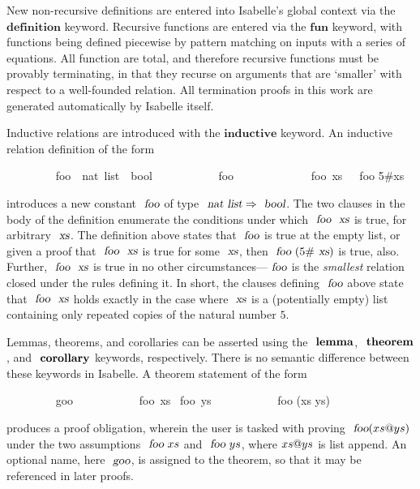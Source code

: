 New non-recursive definitions are entered into Isabelle's global context via the $\mathbf{definition}$ keyword.
Recursive functions are entered via the $\mathbf{fun}$ keyword, with functions being defined piecewise by pattern matching on inputs with a series of equations.
All function are total, and therefore recursive functions must be provably terminating, in that they recurse on arguments that are `smaller' with respect to a well-founded relation.
All termination proofs in this work are generated automatically by Isabelle itself.

Inductive relations are introduced with the $\mathbf{inductive}$ keyword.
An inductive relation definition of the form
\vspace{0.375em}
\begin{isabellebody}
\ \ \ \ \ \ \ \  foo\ {\isacharcolon}{\isacharcolon}\ {\isachardoublequoteopen}nat\ list\ {\isasymRightarrow}\ bool{\isachardoublequoteclose}\ \isanewline
\ \ \ \ \ \ \ \ \ \ {\isachardoublequoteopen}foo\ {\isacharbrackleft}{\isacharbrackright}{\isachardoublequoteclose}\ {\isacharbar}\isanewline
\ \ \ \ \ \ \ \ \ \ {\isachardoublequoteopen}{\isasymlbrakk}\ foo\ xs\ {\isasymrbrakk}\ {\isasymLongrightarrow}\ foo {\isacharparenleft}5\#xs{\isacharparenright}{\isachardoublequoteclose}
\end{isabellebody}
\vspace{0.375em}
\noindent
introduces a new constant $\isa{foo}$ of type $\isa{nat list} \Rightarrow \isa{bool}$.
The two clauses in the body of the definition enumerate the conditions under which $\isa{foo}\ \isa{xs}$ is true, for arbitrary $\isa{xs}$.
The definition above states that $\isa{foo}$ is true at the empty list, or given a proof that $\isa{foo}\ \isa{xs}$ is true for some $\isa{xs}$, then $\isa{foo}\ (5\#\isa{xs})$ is true, also.
Further, $\isa{foo}\ \isa{xs}$ is true in no other circumstances---$\isa{foo}$ is the \emph{smallest} relation closed under the rules defining it.
In short, the clauses defining $\isa{foo}$ above state that $\isa{foo}\ \isa{xs}$ holds exactly in the case where $\isa{xs}$ is a (potentially empty) list containing only repeated copies of the natural number $5$.

Lemmas, theorems, and corollaries can be asserted using the $\isacommand{lemma}$, $\isacommand{theorem}$, and $\isacommand{corollary}$ keywords, respectively.
There is no semantic difference between these keywords in Isabelle.
A theorem statement of the form
\vspace{0.375em}
\begin{isabellebody}
\ \ \ \ \ \ \ \  goo{\isacharcolon}\isanewline
\ \ \ \ \ \ \ \ \ \ \ foo\ xs \ foo\ ys \isanewline
\ \ \ \ \ \ \ \ \ \ \ foo (xs \isacharat ys)
\end{isabellebody}
\vspace{0.375em}
\noindent
produces a proof obligation, wherein the user is tasked with proving $\isa{foo} (xs \isacharat ys)$ under the two assumptions $\isa{foo}\ xs$ and $\isa{foo}\ ys$, where $xs \emph{$@$} ys$ is list append.
An optional name, here $\isa{goo}$, is assigned to the theorem, so that it may be referenced in later proofs.

